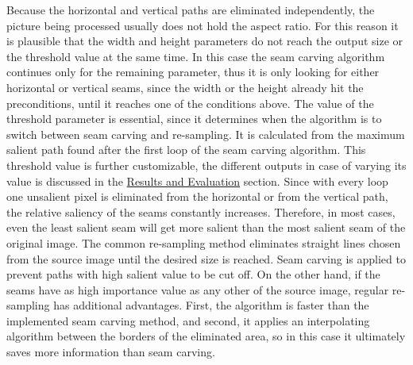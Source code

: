 \documentclass[draft,final]{vutinfth} %
\begin{document}
	Because the horizontal and vertical paths are eliminated independently, the picture being processed usually does not hold the aspect ratio.
	For this reason it is plausible that the width and height parameters do not reach the output size or the threshold value at the same time.
	In this case the seam carving algorithm continues only for the remaining parameter, thus it is only looking for either horizontal or vertical seams, since the width or the height already hit the preconditions, until it reaches one of the conditions above. 
	The value of the threshold parameter is essential,	since it determines when the algorithm is to switch between seam carving and re-sampling. 
	It is calculated from the maximum salient path found after the first loop of the seam carving algorithm.
	This threshold value is further customizable, the different outputs in case of varying its value is discussed in the \hyperref[res:resampling]{Results and Evaluation} section.
	Since with every loop one unsalient pixel is eliminated from the horizontal or from the vertical path, the relative saliency of the seams constantly increases.
	Therefore, in most cases, even the least salient seam will get more salient than the most salient seam of the original image. 
	The common re-sampling method eliminates straight lines chosen from the source image until the desired size is reached.
	Seam carving is applied to prevent paths with high salient value to be cut off.
	On the other hand, if the seams have as high importance value as any other of the source image, regular re-sampling has additional advantages.
	First, the algorithm is faster than the implemented seam carving method, and second, it applies an interpolating algorithm between the borders of the eliminated area, so in this case it ultimately saves more information than seam carving.   

	
\end{document}
